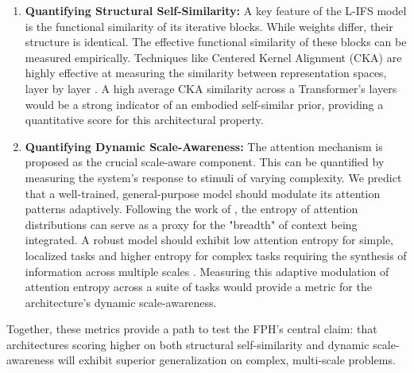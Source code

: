 \documentclass[11pt,a4paper]{article}
\begin{document}
\begin{enumerate}
    \item \textbf{Quantifying Structural Self-Similarity:} A key feature of the L-IFS model is the functional similarity of its iterative blocks. While weights differ, their structure is identical. The effective functional similarity of these blocks can be measured empirically. Techniques like Centered Kernel Alignment (CKA) are highly effective at measuring the similarity between representation spaces, layer by layer \citep{kornblith2019similarity}. A high average CKA similarity across a Transformer's layers would be a strong indicator of an embodied self-similar prior, providing a quantitative score for this architectural property.

    \item \textbf{Quantifying Dynamic Scale-Awareness:} The attention mechanism is proposed as the crucial scale-aware component. This can be quantified by measuring the system's response to stimuli of varying complexity. We predict that a well-trained, general-purpose model should modulate its attention patterns adaptively. Following the work of \cite{zhai2023stabilizing}, the entropy of attention distributions can serve as a proxy for the "breadth" of context being integrated. A robust model should exhibit low attention entropy for simple, localized tasks and higher entropy for complex tasks requiring the synthesis of information across multiple scales \citep{costa2022multiscale}. Measuring this adaptive modulation of attention entropy across a suite of tasks would provide a metric for the architecture's dynamic scale-awareness.
\end{enumerate}
Together, these metrics provide a path to test the FPH's central claim: that architectures scoring higher on both structural self-similarity and dynamic scale-awareness will exhibit superior generalization on complex, multi-scale problems.
\end{document}
